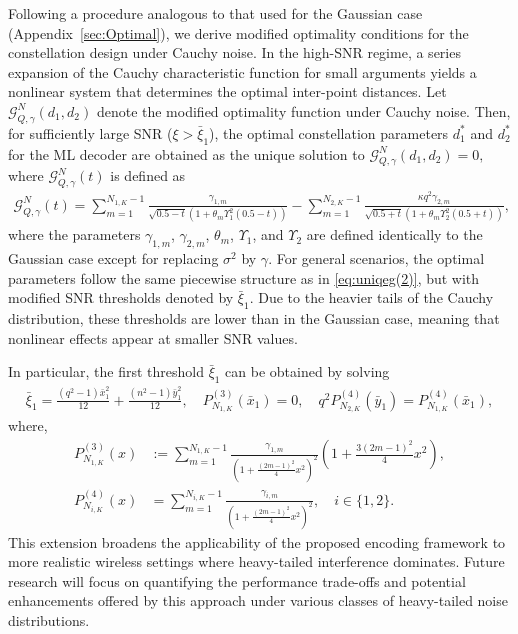 \documentclass[journal,12pt,onecolumn,draftclsnofoot]{IEEEtran}
\theoremstyle{definition}
\begin{document}
Following a procedure analogous to that used for the Gaussian case (Appendix~\ref{sec:Optimal}), we derive modified optimality conditions for the constellation design under Cauchy noise.  In the high-SNR regime, a series expansion of the Cauchy characteristic function for small arguments yields a nonlinear system that determines the optimal inter-point distances.  Let \( \mathcal{G}_{Q,\gamma}^{N}(d_1, d_2) \) denote the modified optimality function under Cauchy noise.  Then, for sufficiently large SNR (\( \xi > \bar{\xi}_1 \)), the optimal constellation parameters \( d_1^* \) and \( d_2^* \) for the ML decoder are obtained as the unique solution to $\mathcal{G}_{Q,\gamma}^{N}(d_1, d_2) = 0,$ where \( \mathcal{G}_{Q,\gamma}^{N}(t) \) is defined as
\begin{align}
\label{eq:MathcalCaucy}
\mathcal{G}_{Q,\gamma}^{N}(t) 
=  
\sum_{m=1}^{N_{1,K}-1} 
\frac{\gamma_{1,m}}
{\sqrt{0.5 - t}\left(1 + \theta_{m}\Upsilon_1^2(0.5 - t)\right)}
-
\sum_{m=1}^{N_{2,K}-1} 
\frac{\kappa q^2 \gamma_{2,m}}
{\sqrt{0.5 + t}\left(1 + \theta_{m}\Upsilon_2^2(0.5 + t)\right)},
\end{align}
where the parameters $\gamma_{1,m}$, $\gamma_{2,m}$, $\theta_{m}$, $\Upsilon_1$, and $\Upsilon_2$ are defined identically to the Gaussian case except for replacing $\sigma^2$ by $\gamma$. For general scenarios, the optimal parameters follow the same piecewise structure as in \eqref{eq:uniqeg(2)}, but with modified SNR thresholds denoted by $\bar{\xi}_1$. 
Due to the heavier tails of the Cauchy distribution, these thresholds are lower than in the Gaussian case, meaning that nonlinear effects appear at smaller SNR values.

In particular, the first threshold $\bar{\xi}_1$ can be obtained by solving
\begin{align}
    \bar{\xi}_1 =  \frac{(q^2-1)\bar{x}_1^2}{12} + \frac{(n^2-1)\bar{y}_1^2}{12}, \quad   P_{N_{1,K}}^{(3)}(\bar{x}_1) = 0,  \quad q^2 P_{N_{2,K}}^{(4)}(\bar{y}_1) = P_{N_{1,K}}^{(4)}(\bar{x}_1), 
\end{align}
where, 
\begin{align*}
    P_{N_{1,K}}^{(3)}(x) &:=\sum_{m=1}^{N_{1,K}-1}\frac{\gamma_{1,m}}{\left(1+\frac{(2m-1)^{2}}{4}x^{2}\right)^{2}}\left(1+\frac{3(2m-1)^{2}}{4}x^{2}\right), \\
    P_{N_{i,K}}^{(4)}(x) &= \sum_{m=1}^{N_{i,K}-1}\frac{\gamma_{i,m}}{\left(1+\frac{(2m-1)^{2}}{4}x^{2}\right)^{2}}, \quad i \in \{1,2\}.
\end{align*}
This extension broadens the applicability of the proposed encoding framework to more realistic wireless settings where heavy-tailed interference dominates.  Future research will focus on quantifying the performance trade-offs and potential enhancements offered by this approach under various classes of heavy-tailed noise distributions.
\end{document}
